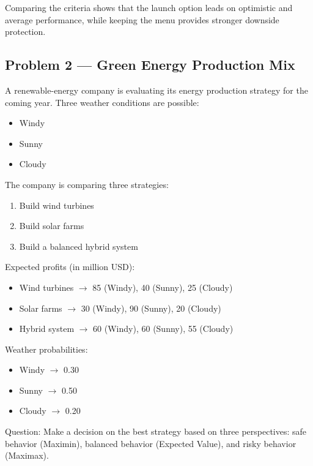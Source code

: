 Comparing the criteria shows that the launch option leads on optimistic and average performance, while keeping the
menu provides stronger downside protection.

\subsection{Problem 2 --- Green Energy Production Mix}\label{subsec:practice-activity-1-problem-2}

A renewable-energy company is evaluating its energy production strategy for the coming year.
Three weather conditions are possible:

\begin{itemize}
	\item Windy
	\item Sunny
	\item Cloudy
\end{itemize}

The company is comparing three strategies:

\begin{enumerate}
	\item Build wind turbines
	\item Build solar farms
	\item Build a balanced hybrid system
\end{enumerate}

Expected profits (in million USD):

\begin{itemize}
	\item Wind turbines \(\rightarrow\) 85 (Windy), 40 (Sunny), 25 (Cloudy)
	\item Solar farms \(\rightarrow\) 30 (Windy), 90 (Sunny), 20 (Cloudy)
	\item Hybrid system \(\rightarrow\) 60 (Windy), 60 (Sunny), 55 (Cloudy)
\end{itemize}

Weather probabilities:

\begin{itemize}
	\item Windy \(\rightarrow\) 0.30
	\item Sunny \(\rightarrow\) 0.50
	\item Cloudy \(\rightarrow\) 0.20
\end{itemize}

Question: Make a decision on the best strategy based on three perspectives: safe behavior (Maximin), balanced behavior (Expected Value), and risky behavior (Maximax).

